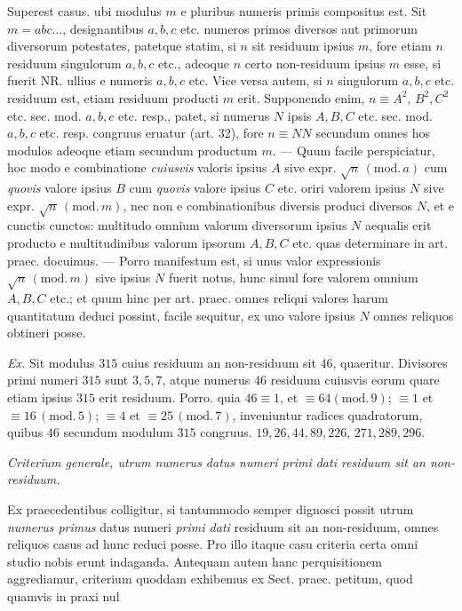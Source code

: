 
Superest casus. ubi modulus $m$ e pluribus numeris primis compositus est. Sit $m=abc\ldots$, designantibus $a,b,c$ etc. numeros primos diversos aut primorum diversorum potestates, patetque statim, si $n$ sit residuum ipsius $m$, fore etiam $n$ residuum singulorum $a,b,c$ etc., adeoque $n$ certo non-residuum ipsius $m$ esse, si fuerit NR. ullius e numeris $a,b,c$ etc. Vice versa autem, si $n$ singulorum $a,b,c$ etc. residuum est, etiam residuum producti $m$ erit. Supponendo enim, $n\equiv A^2$, $B^2,C^2$ etc. sec. mod. $a,b,c$ etc. resp., patet, si numerus $N$ ipsis $A,B,C$ etc. sec. mod. $a,b,c$ etc. resp. congruus eruatur (art. 32), fore $n\equiv NN$ secundum omnes hos modulos adeoque etiam secundum productum $m$. --- Quum facile perspiciatur, hoc modo e combinatione \emph{cuiusvis} valoris ipsius $A$ sive expr. $\surd n\,(\mathrm{mod.}\,a)$ cum \emph{quovis} valore ipsius $B$ cum \emph{quovis} valore ipsius $C$ etc. oriri valorem ipsius $N$ sive expr. $\surd n\,(\mathrm{mod.}\,m)$, nec non e combinationibus diversis produci diversos $N$, et e cunctis cunctos: multitudo omnium valorum diversorum ipsius $N$ aequalis erit producto e multitudinibus valorum ipsorum $A,B,C$ etc. quas determinare in art. praec. docuimus. --- Porro manifestum est, si unus valor expressionis $\surd n\,(\mathrm{mod.}\,m)$ sive ipsius $N$ fuerit notus, hunc simul fore valorem omnium $A,B,C$ etc.; et quum hinc per art. praec. omnes reliqui valores harum quantitatum deduci possint, facile sequitur, ex uno valore ipsius $N$ omnes reliquos obtineri posse.

\emph{Ex.} Sit modulus $315$ cuius residuum an non-residuum sit $46$, quaeritur. Divisores primi numeri $315$ sunt $3,5,7$, atque numerus $46$ residuum cuiusvis eorum quare etiam ipsius $315$ erit residuum. Porro. quia $46\equiv1$, et $\equiv64 (\mathrm{mod.}\,9)$; $\equiv1$ et $\equiv16\,(\mathrm{mod.}\,5)$; $\equiv4$ et $\equiv25\,(\mathrm{mod.}\,7)$, inveniuntur radices quadratorum, quibus $46$ secundum modulum $315$ congruus. $19,26,44,89,226$, $271,289,296$.

\begin{center}
\small\itshape
Criterium generale, utrum numerus datus numeri primi dati residuum sit an non-residuum.
\end{center}


Ex praecedentibus colligitur, si tantummodo semper dignosci possit utrum \emph{numerus primus} datus numeri \emph{primi dati} residuum sit an non-residuum, omnes reliquos casus ad hunc reduci posse. Pro illo itaque casu criteria certa omni studio nobis erunt indaganda. Antequam autem hanc perquisitionem aggrediamur, criterium quoddam exhibemus ex Sect. praec. petitum, quod quamvis in praxi nul%
